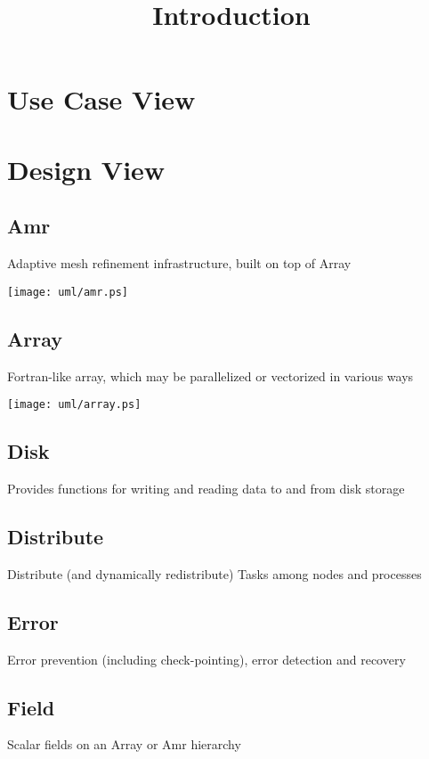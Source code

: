 \documentclass{book}
\begin{document}

\tableofcontents

\title{Introduction} \label{s:intro}


\chapter{Use Case View}

\chapter{Design View}


\section{Amr}
 	 Adaptive mesh refinement infrastructure, built on top of Array

\centerline{\texttt{[image: uml/amr.ps]}}

\section{Array}
 	Fortran-like array, which may be parallelized or vectorized in various ways

\centerline{\texttt{[image: uml/array.ps]}}

\section{Disk}
 	Provides functions for writing and reading data to and from disk storage
\section{Distribute}
 	Distribute (and dynamically redistribute) Tasks among nodes and processes
\section{Error}
 	Error prevention (including check-pointing), error detection and recovery
\section{Field}
 	Scalar fields on an Array or Amr hierarchy
\end{document}

